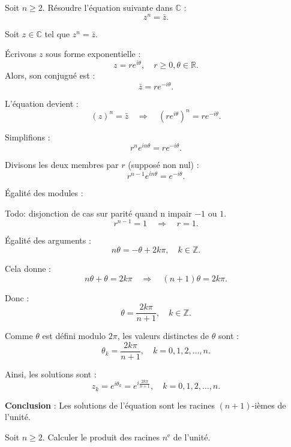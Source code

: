 \documentclass[a4paper,12pt]{article}
\begin{document}
\begin{tcolorbox}[title=Exercice 10 - {[}Calculer{]}]
Soit \( n \geq 2 \). Résoudre l’équation suivante dans \( \mathbb{C} \) :
\[
z^n = \bar{z}.
\]
\end{tcolorbox}

\begin{solutionbox}
Soit \( z \in \mathbb{C} \) tel que \( z^n = \bar{z} \).

Écrivons \( z \) sous forme exponentielle :
\[
z = r e^{i\theta}, \quad r \geq 0, \theta \in \mathbb{R}.
\]
Alors, son conjugué est :
\[
\bar{z} = r e^{-i\theta}.
\]

L'équation devient :
\[
(z)^n = \bar{z} \quad \Rightarrow \quad (r e^{i\theta})^n = r e^{-i\theta}.
\]

Simplifions :
\[
r^n e^{in\theta} = r e^{-i\theta}.
\]

Divisons les deux membres par \( r \) (supposé non nul) :
\[
r^{n-1} e^{in\theta} = e^{-i\theta}.
\]

Égalité des modules :

Todo: disjonction de cas sur parité quand n impair $-1$ ou $1$.
\[
r^{n-1} = 1 \quad \Rightarrow \quad r = 1.
\]

Égalité des arguments :
\[
n\theta = -\theta + 2k\pi, \quad k \in \mathbb{Z}.
\]

Cela donne :
\[
n\theta + \theta = 2k\pi \quad \Rightarrow \quad (n + 1)\theta = 2k\pi.
\]

Donc :
\[
\theta = \dfrac{2k\pi}{n+1}, \quad k \in \mathbb{Z}.
\]

Comme \( \theta \) est défini modulo \( 2\pi \), les valeurs distinctes de \( \theta \) sont :
\[
\theta_k = \dfrac{2k\pi}{n+1}, \quad k = 0, 1, 2, \dots, n.
\]

Ainsi, les solutions sont :
\[
z_k = e^{i\theta_k} = e^{i\frac{2k\pi}{n+1}}, \quad k = 0, 1, 2, \dots, n.
\]

\textbf{Conclusion} : Les solutions de l'équation sont les racines \((n+1)\)-ièmes de l'unité.
\end{solutionbox}

\begin{tcolorbox}[title=Exercice 11 - {[}Calculer{]}]
Soit \( n \geq 2 \). Calculer le produit des racines \( n^{\text{e}} \) de l’unité.
\end{tcolorbox}
\end{document}
